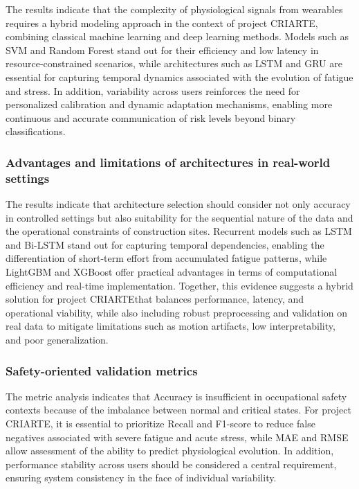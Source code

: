 \documentclass[runningheads]{llncs}
\newcommand{\criarteAcronym}{CRIARTE}
\begin{document}
The results indicate that the complexity of physiological signals from wearables requires a hybrid modeling approach in the context of project \criarteAcronym, combining classical machine learning and deep learning methods. Models such as SVM and Random Forest stand out for their efficiency and low latency in resource-constrained scenarios, while architectures such as LSTM and GRU are essential for capturing temporal dynamics associated with the evolution of fatigue and stress. In addition, variability across users reinforces the need for personalized calibration and dynamic adaptation mechanisms, enabling more continuous and accurate communication of risk levels beyond binary classifications.

\subsubsection*{Advantages and limitations of architectures in real-world settings}

The results indicate that architecture selection should consider not only accuracy in controlled settings but also suitability for the sequential nature of the data and the operational constraints of construction sites. Recurrent models such as LSTM and Bi-LSTM stand out for capturing temporal dependencies, enabling the differentiation of short-term effort from accumulated fatigue patterns, while LightGBM and XGBoost offer practical advantages in terms of computational efficiency and real-time implementation. Together, this evidence suggests a hybrid solution for project \criarteAcronym that balances performance, latency, and operational viability, while also including robust preprocessing and validation on real data to mitigate limitations such as motion artifacts, low interpretability, and poor generalization.

\subsubsection*{Safety-oriented validation metrics}

The metric analysis indicates that Accuracy is insufficient in occupational safety contexts because of the imbalance between normal and critical states. For project \criarteAcronym, it is essential to prioritize Recall and F1-score to reduce false negatives associated with severe fatigue and acute stress, while MAE and RMSE allow assessment of the ability to predict physiological evolution. In addition, performance stability across users should be considered a central requirement, ensuring system consistency in the face of individual variability.
\end{document}
